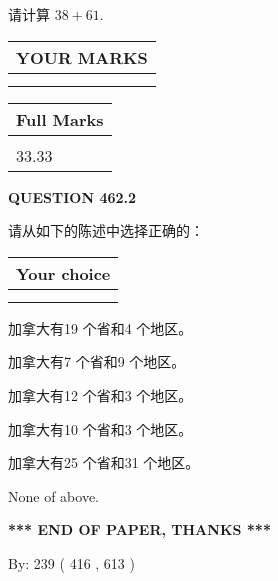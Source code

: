 \documentclass{ctexart}
\begin{document}
  
 
请计算 $ %
38 +  %
61 $.
 

 

 
  
\vspace{0.2in}
  
\noindent\begin{tabular}{|l|}
\hline
 YOUR MARKS  \\
\hline
 \\ 
 \\ 
\hline
\end{tabular}
\hspace{0.05in} \begin{tabular}{|l|}
\hline
 Full Marks  \\
\hline
 \\ 
33.33 \\
\hline
\end{tabular}
{\textbf{\Large{QUESTION
462.2 
}}}
  
  
请从如下的陈述中选择正确的：
  
  
\noindent\hspace{3.0in} \begin{tabular}{|l|}
\hline
Your choice \\
\hline
 \\ 
 \\ 
\hline
\end{tabular}
  
  
 
 
加拿大有19 个省和4 个地区。
 
 
加拿大有7 个省和9 个地区。
 
 
加拿大有12 个省和3 个地区。
 
 
加拿大有10 个省和3 个地区。
 
 
加拿大有25 个省和31 个地区。
 
 
 None of above.
 
 
   
   
 \vspace{0.2in}
 
   
   
   
   
\vspace{1.0in} 
{\textbf{\large{ *** END OF PAPER, THANKS *** }}} 
   
   
\hspace{1.0in} By: 
 239 ( 416 ,  613 )
   
\end{document}
